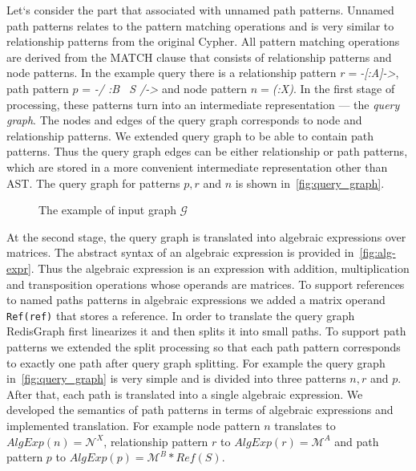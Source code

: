Let`s consider the part that associated with unnamed path patterns. Unnamed path patterns relates to the pattern matching operations and is very similar to relationship patterns from the original Cypher. All pattern matching operations are derived from the MATCH clause that consists of relationship patterns and node patterns. In the example query there is a relationship pattern $r = $\textit{-[:A]->}, path pattern $p$ = \textit{-/ :B ~S /->} and node pattern $n = $\textit{(:X)}. In the first stage of processing, these patterns turn into an intermediate representation --- the \textit{query graph}. The nodes and edges of the query graph corresponds to node and relationship patterns. We extended query graph to be able to contain path patterns. Thus the query graph edges can be either relationship or path patterns, which are stored in a more convenient intermediate representation other than AST. The query graph for patterns $p, r$ and $n$ is shown in~\autoref{fig:query_graph}.

\begin{figure}[h]
    \centering        
    \caption{The example of input graph $\mathcal{G}$}
    \label{fig:query_graph}
\end{figure}

At the second stage, the query graph is translated into algebraic expressions over matrices. The abstract syntax of an algebraic expression is provided in~\autoref{fig:alg-expr}. Thus the algebraic expression is an expression with addition, multiplication and transposition operations whose operands are matrices. To support references to named paths patterns in algebraic expressions we added a matrix operand \lstinline{Ref(ref)} that stores a reference. In order to translate the query graph RedisGraph first linearizes it and then splits it into small paths. To support path patterns we extended the split processing so that each path pattern corresponds to exactly one path after query graph splitting. For example the query graph in~\autoref{fig:query_graph} is very simple and is divided into three patterns $n, r$ and $p$. After that, each path is translated into a single algebraic expression. We developed the semantics of path patterns in terms of algebraic expressions and implemented translation. For example node pattern $n$ translates to $AlgExp(n) = \mathcal{N}^X$, relationship pattern $r$ to $AlgExp(r) = \mathcal{M}^A$ and path pattern $p$ to $AlgExp(p) = \mathcal{M}^B * Ref(S)$.

